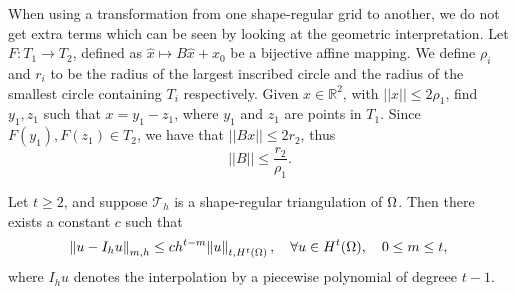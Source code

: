 When using a transformation from one shape-regular grid to another, we do not get extra terms which can be seen by looking at the geometric interpretation.
Let $F:T_1 \to T_2$, defined as $ \hat{x} \mapsto B\hat{x} + x_0$ be a bijective affine mapping. 
We define $\rho_i$ and $r_i$ to be the radius of the largest inscribed circle and the radius of the smallest circle containing $T_i$ respectively.
Given $x \in \mathbb{R}^2$, with $||x|| \leq 2 \rho_1$, find $y_1, z_1$ such that $x = y_1 - z_1$, where $y_1$ and $z_1$ are points in $T_1$. 
Since $F(y_1), F(z_1) \in T_2$, we have that $||Bx|| \leq 2r_2$, thus
\begin{equation}\label{eq:6.9}
    ||B|| \leq \frac{r_2}{\rho_1}.
\end{equation}
\begin{thmx}{\quad\label{thm:6.4}}
    Let $t \geq 2$, and suppose $\mathcal{T}_h$ is a shape-regular triangulation of $\Omega$. Then there exists a constant $c$ such that
    \begin{equation}
        \norm{u - I_h u}_{m,h} \leq c h^{t-m} \norm{u}_{t, H^t(\Omega)}, \quad \forall u \in H^t(\Omega), \quad 0 \leq m \leq t,
        \label{eq:6.5}
    \end{equation}
    where $I_h u$ denotes the interpolation by a piecewise polynomial of degreee $t-1$.
\end{thmx}

